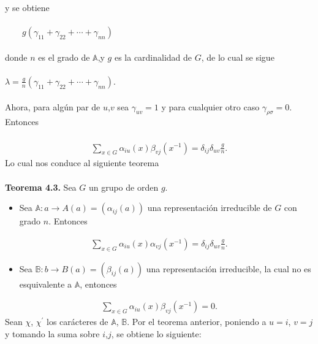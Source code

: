 \documentclass[12pt]{book}
\theoremstyle{definition}
\newcounter{in}
\begin{document}
y se obtiene\\~\\
$\qquad g(\gamma_{11}+\gamma_{22}+ \cdots +\gamma_{nn})$\\~\\
donde $n$ es el grado de $\mathbb{A}$,y $g$ es la cardinalidad de $G$, de lo cual se sigue\\~\\
$\lambda=\frac{g}{n}(\gamma_{11}+\gamma_{22}+ \cdots + \gamma_{nn})$.\\~\\
Ahora, para algún par de $u$,$v$ sea $\gamma_{uv}=1$ y para cualquier otro caso $\gamma_{\rho \sigma}=0$. Entonces\\~\\
\begin{equation*}
\begin{aligned}
\sum_{x \in G} \alpha_{iu}(x) \beta_{vj}(x^{-1}) = \delta_{ij} \delta_{uv}\frac{g}{n}.
\end{aligned}
\end{equation*}
Lo cual nos conduce al siguiente teorema\\~\\
\textbf{Teorema 4.3. } Sea $G$ un grupo de orden $g$.
\begin{itemize}
\item Sea $\mathbb{A}: a \rightarrow A(a)=(\alpha_{ij}(a))$ una representación irreducible de $G$ con grado $n$. Entonces
\end{itemize}
\begin{equation*}
\begin{aligned}
\sum_{x \in G} \alpha_{iu}(x) \alpha_{vj}(x^{-1}) = \delta_{ij} \delta_{uv}\frac{g}{n}.
\end{aligned}
\end{equation*}
\begin{itemize}
\item Sea $\mathbb{B}:b \rightarrow B(a)=(\beta_{ij}(a))$ una representación irreducible, la cual no es esquivalente a $\mathbb{A}$, entonces
\end{itemize}
\begin{equation*}
\begin{aligned}
\sum_{x \in G} \alpha_{iu}(x) \beta_{vj}(x^{-1}) = 0.
\end{aligned}
\end{equation*}
Sean $\chi$, $\chi^{'}$ los carácteres de $\mathbb{A}$, $\mathbb{B}$. Por el teorema anterior, poniendo a $u=i$, $v=j$ y tomando la suma sobre $i$,$j$, se obtiene lo siguiente:\\~\\
\end{document}
